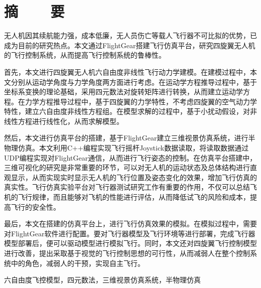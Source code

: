 ﻿

\renewcommand{\baselinestretch}{1.5}
\fontsize{12pt}{13pt} \selectfont

\chapter*{摘~~~~要}

\vspace{1em}

无人机因其续航能力强，成本低廉，无人员伤亡等载人飞行器不可比拟的优势，已成为目前的研究热点。本文通过FlightGear搭建飞行仿真平台，研究四旋翼无人机的飞行控制系统，从而提高飞行控制系统的鲁棒性。

首先，本文进行四旋翼无人机六自由度非线性飞行动力学建模。在建模过程中，本文分别从运动学角度与力学角度两方面进行考虑。在运动学方程推导过程中，基于坐标系变换的理论基础，采用四元数法对旋转矩阵进行转换，从而建立运动学方程。在力学方程推导过程中，基于四旋翼的力学特性，不考虑四旋翼的空气动力学特性，建立六自由度非线性方程组。在模型求解的过程中，基于小扰动假设，对非线性方程进行线性化，从而求解模型。

然后，本文进行仿真平台的搭建，基于FlightGear建立三维视景仿真系统，进行半物理仿真。本文利用C++编程实现飞行摇杆Joystick数据读取，将读取数据通过UDP编程实现对FlightGear通信，从而进行飞行姿态的控制。在仿真平台搭建中，三维可视化的研究是非常重要的环节，可以对无人机的运动状态及总体结构进行直观显示，从而实现实时显示无人机的飞行位置及姿态变化的效果，增加飞行仿真的真实性。飞行仿真实验平台对飞行器测试研究工作有重要的作用，不仅可以总结飞机的飞行规律，而且能够对飞机的性能进行评估，从而降低试飞的风险和成本，提高飞行的安全性。

最后，本文在搭建的仿真平台上，进行飞行仿真效果的模拟。在模拟过程中，需要对FlightGear软件进行配置。要对飞行器模型及飞行环境等进行部署，完成飞行器模型部署后，便可以驱动模型进行模拟飞行。同时，本文还对四旋翼飞行控制模型进行改善，提出采取基于视觉的飞行控制思想的可行性，从而减弱人在整个控制系统中的角色，减弱人的干预，实现自主飞行。

\vspace{0.1in}
 六自由度飞控模型，四元数法，三维视景仿真系统，半物理仿真


﻿﻿


